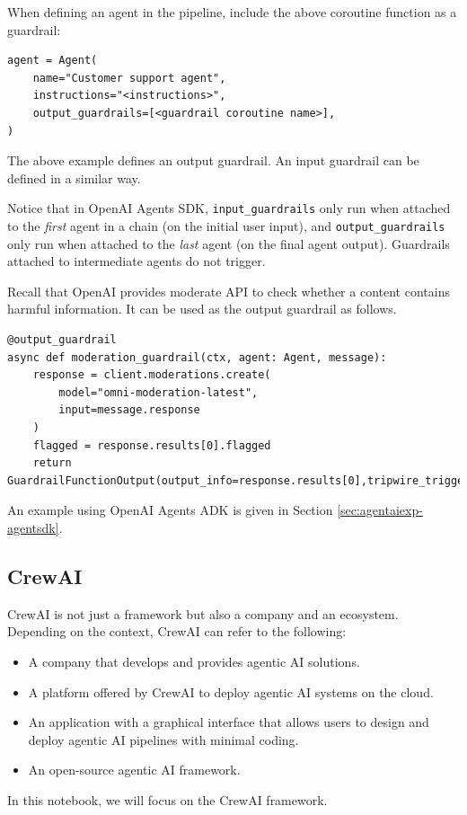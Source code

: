 When defining an agent in the pipeline, include the above coroutine function as a guardrail:

\begin{lstlisting}
agent = Agent( 
	name="Customer support agent",
	instructions="<instructions>",
	output_guardrails=[<guardrail coroutine name>],
)
\end{lstlisting}

The above example defines an output guardrail. An input guardrail can be defined in a similar way.

Notice that in OpenAI Agents SDK, \verb|input_guardrails| only run when attached to the \emph{first} agent in a chain (on the initial user input), and \verb|output_guardrails| only run when attached to the \emph{last} agent (on the final agent output). Guardrails attached to intermediate agents do not trigger.

Recall that OpenAI provides moderate API to check whether a content contains harmful information. It can be used as the output guardrail as follows.
\begin{lstlisting}
@output_guardrail
async def moderation_guardrail(ctx, agent: Agent, message):
	response = client.moderations.create(
		model="omni-moderation-latest",
		input=message.response
	)
	flagged = response.results[0].flagged
	return GuardrailFunctionOutput(output_info=response.results[0],tripwire_triggered=flagged)
\end{lstlisting}

An example using OpenAI Agents ADK is given in Section \ref{sec:agentaiexp-agentsdk}.

\subsection{CrewAI}

CrewAI is not just a framework but also a company and an ecosystem. Depending on the context, CrewAI can refer to the following:
\begin{itemize}
	\item A company that develops and provides agentic AI solutions.
	\item A platform offered by CrewAI to deploy agentic AI systems on the cloud.
	\item An application with a graphical interface that allows users to design and deploy agentic AI pipelines with minimal coding.
	\item An open-source agentic AI framework.
\end{itemize}
In this notebook, we will focus on the CrewAI framework.

